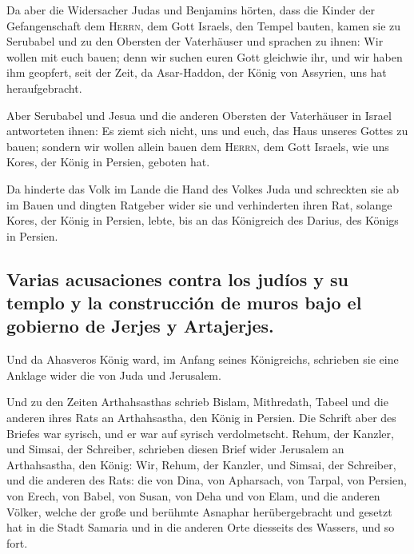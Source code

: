  Da aber die Widersacher Judas und Benjamins hörten, dass
die Kinder der Gefangenschaft dem \textsc{Herrn}, dem Gott Israels, den
Tempel bauten,  kamen sie zu Serubabel und zu den Obersten
der Vaterhäuser und sprachen zu ihnen: Wir wollen mit euch bauen; denn
wir suchen euren Gott gleichwie ihr, und wir haben ihm geopfert, seit
der Zeit, da Asar-Haddon, der König von Assyrien, uns hat
heraufgebracht.

 Aber Serubabel und Jesua und die anderen Obersten der
Vaterhäuser in Israel antworteten ihnen: Es ziemt sich nicht, uns und
euch, das Haus unseres Gottes zu bauen; sondern wir wollen allein bauen
dem \textsc{Herrn}, dem Gott Israels, wie uns Kores, der König in
Persien, geboten hat.

 Da hinderte das Volk im Lande die Hand des Volkes Juda
und schreckten sie ab im Bauen  und dingten Ratgeber wider
sie und verhinderten ihren Rat, solange Kores, der König in Persien,
lebte, bis an das Königreich des Darius, des Königs in Persien.

\hypertarget{varias-acusaciones-contra-los-juduxedos-y-su-templo-y-la-construcciuxf3n-de-muros-bajo-el-gobierno-de-jerjes-y-artajerjes.}{%
\subsection{Varias acusaciones contra los judíos y su templo y la
construcción de muros bajo el gobierno de Jerjes y
Artajerjes.}\label{varias-acusaciones-contra-los-juduxedos-y-su-templo-y-la-construcciuxf3n-de-muros-bajo-el-gobierno-de-jerjes-y-artajerjes.}}

 Und da Ahasveros König ward, im Anfang seines
Königreichs, schrieben sie eine Anklage wider die von Juda und
Jerusalem.

 Und zu den Zeiten Arthahsasthas schrieb Bislam,
Mithredath, Tabeel und die anderen ihres Rats an Arthahsastha, den König
in Persien. Die Schrift aber des Briefes war syrisch, und er war auf
syrisch verdolmetscht.  Rehum, der Kanzler, und Simsai,
der Schreiber, schrieben diesen Brief wider Jerusalem an Arthahsastha,
den König:  Wir, Rehum, der Kanzler, und Simsai, der
Schreiber, und die anderen des Rats: die von Dina, von Apharsach, von
Tarpal, von Persien, von Erech, von Babel, von Susan, von Deha und von
Elam,  und die anderen Völker, welche der große und
berühmte Asnaphar herübergebracht und gesetzt hat in die Stadt Samaria
und in die anderen Orte diesseits des Wassers, und so fort.

